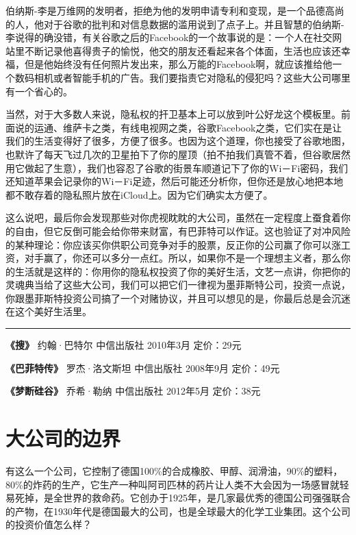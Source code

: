 伯纳斯-李是万维网的发明者，拒绝为他的发明申请专利和变现，是一个品德高尚的人，他对于谷歌的批判和对信息数据的滥用说到了点子上。并且智慧的伯纳斯-李说得的确没错，有关谷歌之后的Facebook的一个故事说的是：一个人在社交网站里不断记录他喜得贵子的愉悦，他交的朋友还看起来各个体面，生活也应该还幸福，但是他始终没有任何照片发出来，那么万能的Facebook啊，就应该推给他一个数码相机或者智能手机的广告。我们要指责它对隐私的侵犯吗？这些大公司哪里有一个省心的。

当然，对于大多数人来说，隐私权的扞卫基本上可以放到叶公好龙这个模板里。前面说的运通、维萨卡之类，有线电视网之类，谷歌Facebook之类，它们实在是让我们的生活变得好了很多，方便了很多。也因为这个道理，你也接受了谷歌地图，也默许了每天飞过几次的卫星拍下了你的屋顶（拍不拍我们真管不着，但谷歌居然用它做起了生意），我们也容忍了谷歌的街景车顺道记下了你的Wi－Fi密码，我们还知道苹果会记录你的Wi－Fi足迹，然后可能还分析你，但你还是放心地把本地都不敢存着的隐私照片放在iCloud上。因为它们确实太方便了。

这么说吧，最后你会发现那些对你虎视眈眈的大公司，虽然在一定程度上蚕食着你的自由，但它反倒可能会给你带来财富，有巴菲特可以作证。这也验证了对冲风险的某种理论：你应该买你供职公司竞争对手的股票，反正你的公司赢了你可以涨工资，对手赢了，你还可以多分一点红。所以，如果你不是一个理想主义者，那么你的生活就是这样的：你用你的隐私权投资了你的美好生活，文艺一点讲，你把你的灵魂典当给了这些大公司，我们可以把它们一律视为墨菲斯特公司，投资一点说，你跟墨菲斯特投资公司搞了一个对赌协议，并且可以想见的是，你最后总是会沉迷在这个美好生活里。

\begin{center}\rule{3in}{0.4pt}\end{center}

\textbf{《搜》} 约翰·巴特尔 中信出版社 2010年3月 定价：29元

\textbf{《巴菲特传》} 罗杰·洛文斯坦 中信出版社 2008年9月 定价：49元

\textbf{《梦断硅谷》} 乔希·勒纳 中信出版社 2012年5月 定价：38元

\section{大公司的边界}

有这么一个公司，它控制了德国100\%的合成橡胶、甲醇、润滑油，90\%的塑料，80\%的炸药的生产，它生产一种叫阿司匹林的药片让人类不大会因为一场感冒就轻易死掉，是全世界的救命药。它创办于1925年，是几家最优秀的德国公司强强联合的产物，在1930年代是德国最大的公司，也是全球最大的化学工业集团。这个公司的投资价值怎么样？

